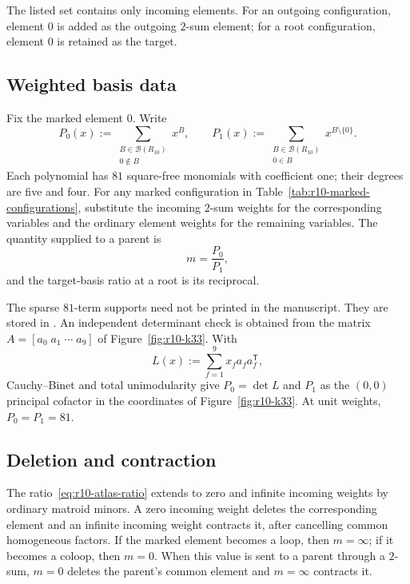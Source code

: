 \documentclass[11pt]{article}
\numberwithin{equation}{section}
\theoremstyle{remark}
\begin{document}
The listed set contains only incoming elements. For an outgoing
configuration, element $0$ is added as the outgoing $2$-sum element; for a
root configuration, element $0$ is retained as the target.

\subsection{Weighted basis data}
\label{app:r10-atlas-response}

Fix the marked element $0$. Write
\begin{equation}
    P_0(x)
    :=
    \sum_{\substack{B\in\mathcal B(R_{10})\\0\notin B}}x^B,
    \qquad
    P_1(x)
    :=
    \sum_{\substack{B\in\mathcal B(R_{10})\\0\in B}}x^{B\setminus\{0\}}.
    \label{eq:r10-atlas-polynomials}
\end{equation}
Each polynomial has $81$ square-free monomials with coefficient one; their
degrees are five and four. For any marked configuration in
Table~\ref{tab:r10-marked-configurations}, substitute the incoming $2$-sum weights
for the corresponding variables and the ordinary element weights for the
remaining variables. The quantity supplied to a parent is
\begin{equation}
    m=\frac{P_0}{P_1},
    \label{eq:r10-atlas-ratio}
\end{equation}
and the target-basis ratio at a root is its reciprocal.

The sparse $81$-term supports need not be printed in the manuscript. They
are stored in
. An independent
determinant check
is obtained from the matrix $A=[a_0\;a_1\;\cdots\;a_9]$ of
Figure~\ref{fig:r10-k33}. With
\begin{equation}
    L(x):=\sum_{f=1}^9 x_f a_fa_f^{\mathsf T},
\end{equation}
Cauchy--Binet and total unimodularity give $P_0=\det L$ and $P_1$ as the
$(0,0)$ principal cofactor in the coordinates of Figure~\ref{fig:r10-k33}. At unit weights,
$P_0=P_1=81$.

\subsection{Deletion and contraction}
\label{app:r10-atlas-minors}

The ratio~\eqref{eq:r10-atlas-ratio} extends to zero and infinite incoming
weights by ordinary matroid minors. A zero incoming weight deletes the
corresponding element and an infinite incoming weight contracts it, after
cancelling common homogeneous factors. If the marked element becomes a loop,
then $m=\infty$; if it becomes a coloop, then $m=0$. When this value is sent
to a parent through a $2$-sum, $m=0$ deletes the parent's common element and
$m=\infty$ contracts it.
\end{document}
